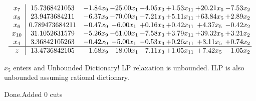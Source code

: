 \documentclass[8pt]{article}
\begin{document}
 \[\begin{array}{c| c c@{\hskip 2pt} c@{\hskip 2pt} c@{\hskip 2pt} c@{\hskip 2pt} c@{\hskip 2pt} c@{\hskip 2pt} }
 x_{7}   &  15.7368421053 & -1.84 x_{9} & -25.00 x_{1} & -4.05 x_{3} & +  1.53 x_{11} & + 20.21 x_{5} & -7.53 x_{2}\\
 x_{8}   &  23.9473684211 & -6.37 x_{9} & -70.00 x_{1} & -7.21 x_{3} & +  5.11 x_{11} & + 63.84 x_{5} & +  2.89 x_{2}\\
 x_{6}   &  0.789473684211 & -0.47 x_{9} & -6.00 x_{1} & +  0.16 x_{3} & +  0.42 x_{11} & +  4.37 x_{5} & -0.42 x_{2}\\
 x_{10}   &  31.1052631579 & -5.26 x_{9} & -61.00 x_{1} & -7.58 x_{3} & +  3.79 x_{11} & + 39.32 x_{5} & +  3.21 x_{2}\\
 x_{4}   &  3.36842105263 & -0.42 x_{9} & -5.00 x_{1} & -0.53 x_{3} & +  0.26 x_{11} & +  3.11 x_{5} & +  0.74 x_{2}\\
\hline
z    &  13.4736842105 & -1.68 x_{9} & -18.00 x_{1} & -7.11 x_{3} & +  1.05 x_{11} & +  7.42 x_{5} & -1.05 x_{2}\\
\end{array}\]


 $ x_{5} $ enters and Unbounded Dictionary!
 LP relaxation is unbounded. ILP is also unbounded assuming rational dictionary. 

Done.Added 0 cuts 
\end{document}
